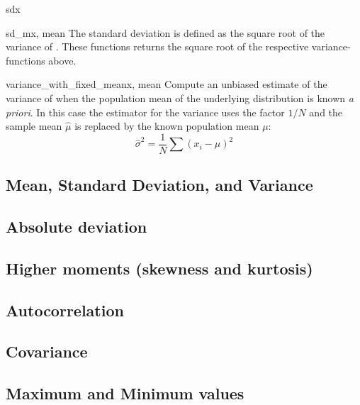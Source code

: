 \begin{funcdesc}{sd}{x}
\end{funcdesc}
\begin{funcdesc}{sd_m}{x, mean}
   The standard deviation is defined as the square root of the variance of
   .  These functions returns the square root of the respective
   variance-functions above.
\end{funcdesc}

\begin{funcdesc}{variance_with_fixed_mean}{x, mean}
   Compute an unbiased estimate of the variance of  when the population
   mean  of the underlying distribution is known \emph{a priori}.  In
   this case the estimator for the variance uses the factor $1/N$ and the
   sample mean $\hat\mu$ is replaced by the known population mean $\mu$:
   \begin{equation}
      \hat\sigma^2 = \frac{1}{N} \sum (x_i - \mu)^2
   \end{equation}
\end{funcdesc}


\subsection{Mean, Standard Deviation, and Variance}
\label{sec:stat:mean-sd-var}


\subsection{Absolute deviation}
\label{sec:stat:absolute-deviation}


\subsection{Higher moments (skewness and kurtosis)}
\label{sec:stat:higher-moments}


\subsection{Autocorrelation}
\label{sec:stat:autocorrelation}


\subsection{Covariance}
\label{sec:stat:covariance}


\subsection{Maximum and Minimum values}
\label{sec:stat:max-min-value}


